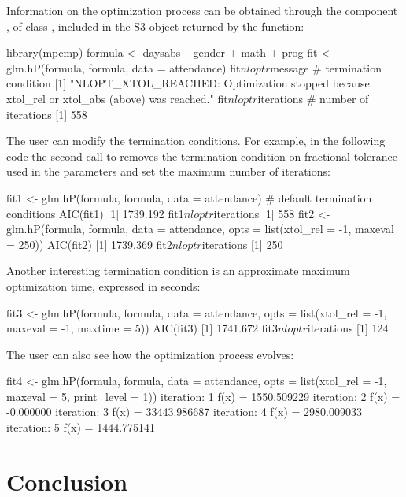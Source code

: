 Information on the optimization process can be obtained through the component , of class , included in the S3 object returned by the  function:

\begin{example}
library(mpcmp)
formula <- daysabs ~ gender + math + prog
fit <- glm.hP(formula, formula, data = attendance)
fit$nloptr$message # termination condition
[1] "NLOPT_XTOL_REACHED: Optimization stopped because xtol_rel or xtol_abs (above) was
reached."
fit$nloptr$iterations # number of iterations
[1] 558
\end{example}

The user can modify the termination conditions. For example, in the following code the second call to  removes the termination condition on fractional tolerance used in the parameters and set the maximum number of iterations:

\begin{example}
fit1 <- glm.hP(formula, formula, data = attendance) # default termination conditions
AIC(fit1)
[1] 1739.192
fit1$nloptr$iterations
[1] 558
fit2 <- glm.hP(formula, formula, data = attendance,
               opts = list(xtol_rel = -1, maxeval = 250))
AIC(fit2)
[1] 1739.369
fit2$nloptr$iterations
[1] 250
\end{example}

Another interesting termination condition is an approximate maximum optimization time, expressed in seconds:

\begin{example}
fit3 <- glm.hP(formula, formula, data = attendance,
               opts = list(xtol_rel = -1, maxeval = -1, maxtime = 5))
AIC(fit3)
[1] 1741.672
fit3$nloptr$iterations
[1] 124
\end{example}

The user can also see how the optimization process evolves:

\begin{example}
fit4 <- glm.hP(formula, formula, data = attendance,
               opts = list(xtol_rel = -1, maxeval = 5, print_level = 1))
iteration: 1
	f(x) = 1550.509229
iteration: 2
	f(x) = -0.000000
iteration: 3
	f(x) = 33443.986687
iteration: 4
	f(x) = 2980.009033
iteration: 5
	f(x) = 1444.775141
\end{example}

\section{Conclusion}

